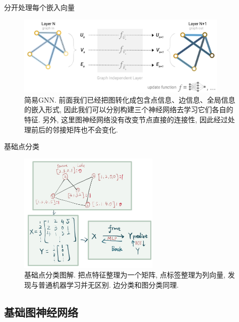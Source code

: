 \documentclass{beamer}
\begin{document}
\begin{frame}{分开处理每个嵌入向量}
    \begin{figure}
        \centering
        \includegraphics[width=0.9\textwidth]{简易GNN.png}
        \caption{简易GNN. 前面我们已经把图转化成包含点信息、边信息、全局信息的嵌入形式, 因此我们可以分别构建三个神经网络去学习它们各自的特征. 另外, 这里图神经网络没有改变节点直接的连接性, 因此经过处理前后的邻接矩阵也不会变化. }
    \end{figure}
\end{frame}

\begin{frame}{基础点分类}
    \begin{figure}
        \centering
        \includegraphics[width=0.6\textwidth]{点分类例子.png}
        \caption{基础点分类图解. 把点特征整理为一个矩阵, 点标签整理为列向量, 发现与普通机器学习并无区别. 边分类和图分类同理. }
    \end{figure}
\end{frame}

\subsection{基础图神经网络}
\end{document}
